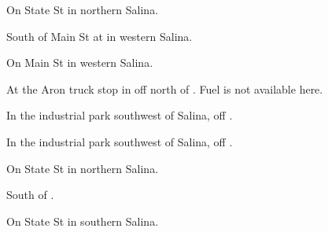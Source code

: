 

\begin{LocationList}

On  State St in northern Salina.

South of Main St at  in western Salina.

On Main St in western Salina.

At the Aron truck stop in  off  north of . Fuel is not available here.

In the industrial park southwest of Salina, off  .

In the industrial park southwest of Salina, off  .

On  State St in northern Salina.

\Location{\TruckStop \Gas \Rest \Weigh}
South of  .

On   State St in southern Salina.

\end{LocationList}
